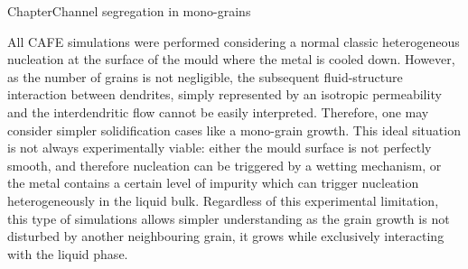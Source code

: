 Chapter{Channel segregation in mono-grains}

All CAFE simulations were performed considering a normal classic heterogeneous nucleation at 
the surface of the mould where the metal is cooled down. However, as the number of grains is
not negligible, the subsequent fluid-structure interaction between dendrites, simply represented by an isotropic permeability 
and the interdendritic flow cannot be easily interpreted. Therefore, one may consider simpler solidification cases 
like a mono-grain growth. This ideal situation is not always experimentally viable: either the mould surface is not 
perfectly smooth, and therefore nucleation can be triggered by a wetting mechanism, or the metal contains a certain level of impurity
which can trigger nucleation heterogeneously in the liquid bulk. 
Regardless of this experimental limitation, this type of simulations allows simpler understanding as the grain growth is not 
disturbed by another neighbouring grain, it grows while exclusively interacting with the liquid phase.

